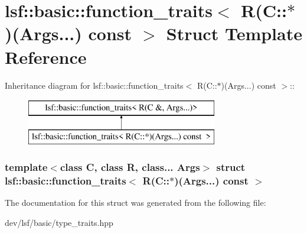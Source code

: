 \hypertarget{structlsf_1_1basic_1_1function__traits_3_01R_07C_1_1_5_08_07Args_8_8_8_08_01const_01_01_4}{
\section{lsf::basic::function\_\-traits$<$ R(C::$\ast$)(Args...) const $>$ Struct Template Reference}
\label{structlsf_1_1basic_1_1function__traits_3_01R_07C_1_1_5_08_07Args_8_8_8_08_01const_01_01_4}
}
Inheritance diagram for lsf::basic::function\_\-traits$<$ R(C::$\ast$)(Args...) const $>$::\begin{figure}[H]
\begin{center}
\leavevmode
\includegraphics[height=2cm]{structlsf_1_1basic_1_1function__traits_3_01R_07C_1_1_5_08_07Args_8_8_8_08_01const_01_01_4}
\end{center}
\end{figure}
\subsubsection*{template$<$class C, class R, class... Args$>$ struct lsf::basic::function\_\-traits$<$ R(C::$\ast$)(Args...) const  $>$}



The documentation for this struct was generated from the following file:\begin{DoxyCompactItemize}
\item 
dev/lsf/basic/type\_\-traits.hpp\end{DoxyCompactItemize}
